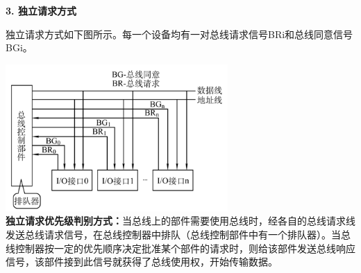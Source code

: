 \textbf{{3. 独立请求方式}}

独立请求方式如下图所示。每一个设备均有一对总线请求信号BRi和总线同意信号BGi。

\includegraphics[width=3.33333in,height=2.20833in]{png-jpeg-pics/C58AA5C5E93045826E3C4BA51215C2B3.png}\\
\textbf{独立请求优先级判别方式：}当总线上的部件需要使用总线时，经各自的总线请求线发送总线请求信号，在总线控制器中排队（总线控制部件中有一个排队器）。当总线控制器按一定的优先顺序决定批准某个部件的请求时，则给该部件发送总线响应信号，该部件接到此信号就获得了总线使用权，开始传输数据。
